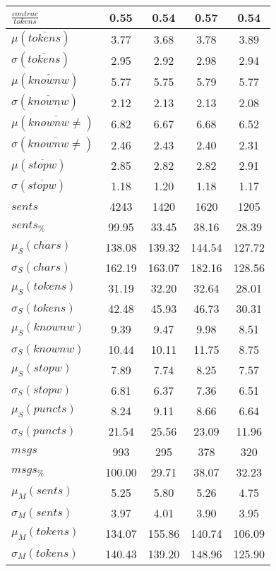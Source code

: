 \begin{table}[h!]
\begin{center}
\begin{tabular}{| l || c | c | c | c |}
$\frac{contrac}{tokens}$ & 0.55  & 0.54  & 0.57  & 0.54 \\\hline\hline
$\mu(\overline{tokens})$ & 3.77  & 3.68  & 3.78  & 3.89 \\
$\sigma(\overline{tokens})$ & 2.95  & 2.92  & 2.98  & 2.94 \\\hline
$\mu(\overline{knownw})$ & 5.77  & 5.75  & 5.79  & 5.77 \\
$\sigma(\overline{knownw})$ & 2.12  & 2.13  & 2.13  & 2.08 \\\hline
$\mu(\overline{knownw \neq})$ & 6.82  & 6.67  & 6.68  & 6.52 \\
$\sigma(\overline{knownw \neq})$ & 2.46  & 2.43  & 2.40  & 2.31 \\\hline
$\mu(\overline{stopw})$ & 2.85  & 2.82  & 2.82  & 2.91 \\
$\sigma(\overline{stopw})$ & 1.18  & 1.20  & 1.18  & 1.17 \\\hline\hline
$sents$ & 4243  & 1420  & 1620  & 1205 \\
$sents_{\%}$ & 99.95  & 33.45  & 38.16  & 28.39 \\\hline
$\mu_S(chars)$ & 138.08  & 139.32  & 144.54  & 127.72 \\
$\sigma_S(chars)$ & 162.19  & 163.07  & 182.16  & 128.56 \\\hline
$\mu_S(tokens)$ & 31.19  & 32.20  & 32.64  & 28.01 \\
$\sigma_S(tokens)$ & 42.48  & 45.93  & 46.73  & 30.31 \\\hline
$\mu_S(knownw)$ & 9.39  & 9.47  & 9.98  & 8.51 \\
$\sigma_S(knownw)$ & 10.44  & 10.11  & 11.75  & 8.75 \\\hline
$\mu_S(stopw)$ & 7.89  & 7.74  & 8.25  & 7.57 \\
$\sigma_S(stopw)$ & 6.81  & 6.37  & 7.36  & 6.51 \\\hline
$\mu_S(puncts)$ & 8.24  & 9.11  & 8.66  & 6.64 \\
$\sigma_S(puncts)$ & 21.54  & 25.56  & 23.09  & 11.96 \\\hline\hline
$msgs$ & 993  & 295  & 378  & 320 \\
$msgs_{\%}$ & 100.00  & 29.71  & 38.07  & 32.23 \\\hline
$\mu_M(sents)$ & 5.25  & 5.80  & 5.26  & 4.75 \\
$\sigma_M(sents)$ & 3.97  & 4.01  & 3.90  & 3.95 \\\hline
$\mu_M(tokens)$ & 134.07  & 155.86  & 140.74  & 106.09 \\
$\sigma_M(tokens)$ & 140.43  & 139.20  & 148.96  & 125.90 \\\hline

\end{tabular}
\end{center}
\end{table}
